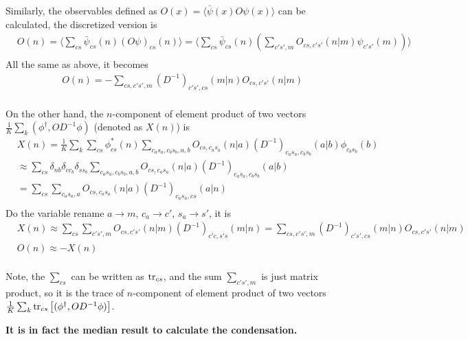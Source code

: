 Similarly, the observables defined as $O(x)=\langle \bar{\psi}(x) O \psi(x) \rangle$ can be calculated, the discretized version is
\begin{equation}
\begin{split}
&O(n)=\langle \sum _{cs}\bar{\psi}_{cs}(n) \left(O\psi \right)_{cs}(n) \rangle = \langle  \sum _{cs}\bar{\psi}_{cs}(n) \left(\sum _{c's',m} O_{cs,c's'} (n|m)\psi _{c's'}(m)\right) \rangle \\
\end{split}
\end{equation}
All the same as above, it becomes
\begin{equation}
\begin{split}
&O(n)=-\sum _{cs,c's',m} (D ^{-1})_{c's',cs}(m|n) O _{cs,c's'}(n|m)\\
\end{split}
\end{equation}

On the other hand, the $n$-component of element product of two vectors $\frac{1}{K}\sum _k (\phi ^{\dagger},  OD^{-1}\phi)$ (denoted as $X(n)$) is
\begin{equation}
\begin{split}
&X(n)=\frac{1}{K}\sum _k \sum _{cs}\phi ^*_{cs}(n) \sum _{c_as_a,c_bs_b,a,b}O _{cs,c_as_a}(n|a)(D ^{-1})_{c_as_a,c_bs_b}(a|b) \phi _{c_bs_b}(b)\\
&\approx \sum _{cs}\delta _{nb}\delta _{cc_b}\delta _{ss_b} \sum _{c_as_a,c_bs_b,a,b} O _{cs,c_as_a}(n|a)(D ^{-1})_{c_as_a,c_bs_b}(a|b) \\
&= \sum _{cs} \sum _{c_as_a,a}O _{cs,c_as_a}(n|a)(D ^{-1})_{c_as_a,cs}(a|n) \\
\end{split}
\end{equation}
Do the variable rename $a\to m$, $c_a\to c'$, $s_a\to s'$, it is
\begin{equation}
\begin{split}
&X(n)\approx \sum _{cs} \sum _{c's',m}O _{cs,c's'}(n|m)(D ^{-1})_{c'c,s's}(m|n) =\sum _{cs, c's',m}(D ^{-1})_{c's',cs}(m|n) O _{cs,c's'}(n|m)\\
&O(n)\approx -X(n)\\
\end{split}
\end{equation}

Note, the $\sum _{cs}$ can be written as ${\rm tr}_{cs}$, and the sum $\sum _{c's',m}$ is just matrix product, so it is the trace of $n$-component of element product of two vectors $\frac{1}{K}\sum _k {\rm tr}_{cs}\left[(\phi ^{\dagger},  OD^{-1}\phi)\right]$.

\textbf{It is in fact the median result to calculate the condensation.}



